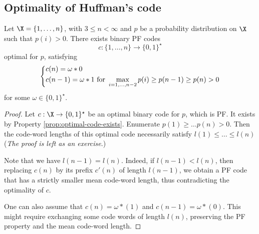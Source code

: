 \documentclass[toc, titlepaged]{../cs-classes/cs-classes}
\begin{document}
\subsection{Optimality of Huffman's code}
\begin{lemma}
    \label{lem:obc-base}
    Let $\X=\{1, \dots, n\}$, with $3\leq n<\infty$ and $p$ be a probability distribution on $\X$ such that $p(i)>0$. There exists binary PF codes
    \begin{equation*}
        c:\{1, \dots, n\} \to \{0, 1\}^\star
    \end{equation*}
    optimal for $p$, satisfying
    \begin{equation}
        \label{eq:base-condition}
        \begin{cases*}
            c(n) = \omega * 0 \\
            c(n-1) = \omega * 1 \textnormal{ for } \displaystyle\max_{i=1, \dots, n-2}p(i) \geq p(n-1)\geq p(n) > 0
        \end{cases*}
    \end{equation}
    for some $\omega\in\{0, 1\}^\star$.
\end{lemma}

\begin{proof}
    Let $c:\X\to\{0, 1\}^\star$ be an optimal binary code for $p$, which is PF. It exists by Property \ref{prop:optimal-code-exists}. Enumerate $p(1)\geq\dots p(n)>0$. Then the code-word lengths of this optimal code necessarily satisfy $l(1)\leq\dots\leq l(n)$ (\emph{The proof is left as an exercise}.)

    Note that we have $l(n-1)=l(n)$. Indeed, if $l(n-1)<l(n)$, then replacing $c(n)$ by its prefix $c'(n)$ of length $l(n-1)$, we obtain a PF code that has a strictly smaller mean code-word length, thus contradicting the optimality of $c$.

    One can also assume that $c(n) = \omega * (1)$ and $c(n-1)=\omega * (0)$. This might require exchanging some code words of length $l(n)$, preserving the PF property and the mean code-word length.
\end{proof}
\end{document}
